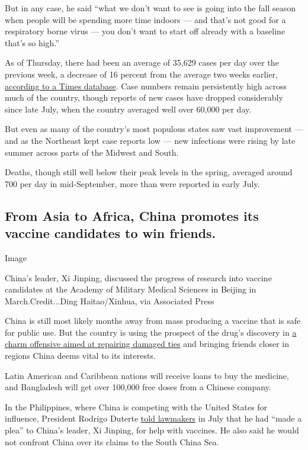 But in any case, he said ``what we don't want to see is going into the
fall season when people will be spending more time indoors --- and
that's not good for a respiratory borne virus --- you don't want to
start off already with a baseline that's so high.''

As of Thursday, there had been an average of 35,629 cases per day over
the previous week, a decrease of 16 percent from the average two weeks
earlier,
\href{https://www.nytimes3xbfgragh.onion/interactive/2020/us/coronavirus-us-cases.html}{according
to a Times database}. Case numbers remain persistently high across much
of the country, though reports of new cases have dropped considerably
since late July, when the country averaged well over 60,000 per day.

But even as many of the country's most populous states saw vast
improvement --- and as the Northeast kept case reports low --- new
infections were rising by late summer across parts of the Midwest and
South.

Deaths, though still well below their peak levels in the spring,
averaged around 700 per day in mid-September, more than were reported in
early July.

\hypertarget{from-asia-to-africa-china-promotes-its-vaccine-candidates-to-win-friends}{%
\subsection{From Asia to Africa, China promotes its vaccine candidates
to win
friends.}\label{from-asia-to-africa-china-promotes-its-vaccine-candidates-to-win-friends}}

Image

China's leader, Xi Jinping, discussed the progress of research into
vaccine candidates at the Academy of Military Medical Sciences in
Beijing in March.Credit...Ding Haitao/Xinhua, via Associated Press

China is still most likely months away from mass producing a vaccine
that is safe for public use. But the country is using the prospect of
the drug's discovery in
\href{https://www.nytimes3xbfgragh.onion/2020/09/11/business/china-vaccine-diplomacy.html}{a
charm offensive aimed at repairing damaged ties} and bringing friends
closer in regions China deems vital to its interests.

Latin American and Caribbean nations will receive loans to buy the
medicine, and Bangladesh will get over 100,000 free doses from a Chinese
company.

In the Philippines, where China is competing with the United States for
influence, President Rodrigo Duterte
\href{https://www.scmp.com/week-asia/politics/article/3094918/duterte-seeks-chinese-coronavirus-vaccine-rules-out-us-bases}{told
lawmakers} in July that he had ``made a plea'' to China's leader, Xi
Jinping, for help with vaccines. He also said he would not confront
China over its claims to the South China Sea.

